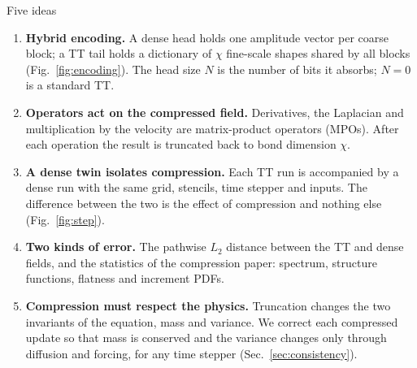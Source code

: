 \documentclass[aps,prfluids,reprint,onecolumn,amsmath,amssymb,nofootinbib,floatfix]{revtex4-2}
\begin{document}
\begin{keybox}{Five ideas}
\begin{enumerate}[leftmargin=*]
\item \textbf{Hybrid encoding.} A dense head holds one amplitude vector per
      coarse block; a TT tail holds a dictionary of $\chi$ fine-scale shapes
      shared by all blocks (Fig.~\ref{fig:encoding}). The head size $N$ is the
      number of bits it absorbs; $N=0$ is a standard TT.
\item \textbf{Operators act on the compressed field.} Derivatives, the
      Laplacian and multiplication by the velocity are matrix-product operators
      (MPOs). After each operation the result is truncated back to bond
      dimension $\chi$.
\item \textbf{A dense twin isolates compression.} Each TT run is accompanied by
      a dense run with the same grid, stencils, time stepper and inputs. The
      difference between the two is the effect of compression and nothing else
      (Fig.~\ref{fig:step}).
\item \textbf{Two kinds of error.} The pathwise $L_2$ distance between the TT
      and dense fields, and the statistics of the compression paper: spectrum,
      structure functions, flatness and increment PDFs.
\item \textbf{Compression must respect the physics.} Truncation changes the
      two invariants of the equation, mass and variance. We correct each
      compressed update so that mass is conserved and the variance changes only
      through diffusion and forcing, for any time stepper
      (Sec.~\ref{sec:consistency}).
\end{enumerate}
\end{keybox}
\end{document}
